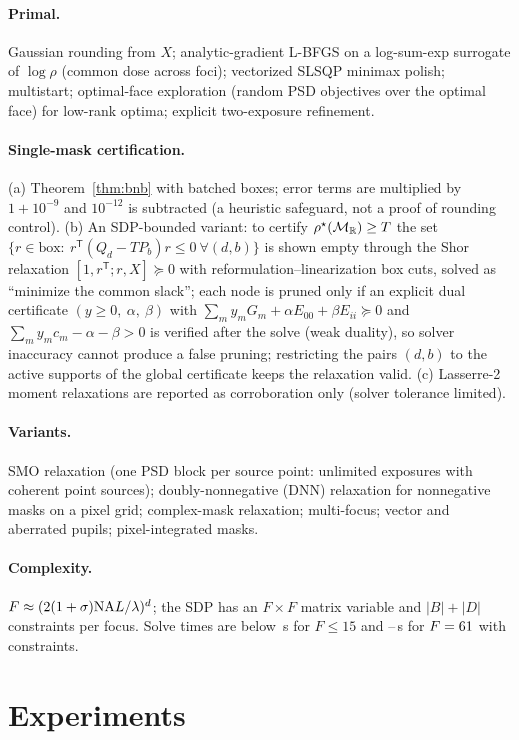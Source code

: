 \documentclass[11pt,a4paper]{article}
\theoremstyle{remark}\newtheorem*{remark}{Remark}
\newcommand{\R}{\mathbb{R}}\newcommand{\C}{\mathbb{C}}\newcommand{\PSD}{\succeq 0}
\begin{document}
\paragraph{Primal.} Gaussian rounding from $X$; analytic-gradient L-BFGS on a log-sum-exp surrogate of $\log\rho$ (common dose across foci); vectorized SLSQP minimax polish; multistart; optimal-face exploration (random PSD objectives over the optimal face) for low-rank optima; explicit two-exposure refinement.
\paragraph{Single-mask certification.} (a) Theorem~\ref{thm:bnb} with batched boxes; error terms are multiplied by $1+10^{-9}$ and $10^{-12}$ is subtracted (a heuristic safeguard, not a proof of rounding control). (b) An SDP-bounded variant: to certify $\rhostar(\mathcal M_\R)\ge T$ the set $\{r\in\text{box}:\ r^{\mathsf T}(Q_d-TP_b)r\le0\ \forall(d,b)\}$ is shown empty through the Shor relaxation $[1,r^{\mathsf T};r,X]\PSD$ with reformulation--linearization box cuts, solved as ``minimize the common slack''; each node is pruned only if an explicit dual certificate $(y\ge0,\ \alpha,\ \beta)$ with $\sum_m y_mG_m+\alpha E_{00}+\beta E_{ii}\PSD$ and $\sum_my_mc_m-\alpha-\beta>0$ is verified after the solve (weak duality), so solver inaccuracy cannot produce a false pruning; restricting the pairs $(d,b)$ to the active supports of the global certificate keeps the relaxation valid. (c) Lasserre-2 moment relaxations \cite{lasserre2001} are reported as corroboration only (solver tolerance limited).
\paragraph{Variants.} SMO relaxation (one PSD block per source point: unlimited exposures with coherent point sources); doubly-nonnegative (DNN) relaxation for nonnegative masks on a pixel grid; complex-mask relaxation; multi-focus; vector and aberrated pupils; pixel-integrated masks.
\paragraph{Complexity.} $F\approx(2(1+\sigma)\mathrm{NA} L/\lambda)^d$; the SDP has an $F\times F$ matrix variable and $|B|+|D|$ constraints per focus. Solve times are below \sdpTimeSmallHi\,s for $F\le15$ and \sdpTimeBigLo--\sdpTimeBigHi\,s for $F=61$ with \tjConstraints{} constraints.

\section{Experiments}\label{sec:exp}
\end{document}
